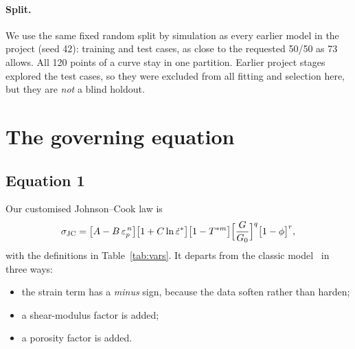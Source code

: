 \documentclass[11pt,a4paper]{article}
\newcommand{\sjc}{\sigma_{\mathrm{JC}}}
\begin{document}
\paragraph{Split.} We use the same fixed random split by simulation as every earlier model in the project (seed 42): \nTrainCases{} training and \nTestCasesSplit{} test cases, as close to the requested 50/50 as 73 allows. All 120 points of a curve stay in one partition. Earlier project stages explored the test cases, so they were excluded from all fitting and selection here, but they are \emph{not} a blind holdout.

\section{The governing equation}
\subsection{Equation 1}
Our customised Johnson--Cook law is
\begin{equation}
\sjc=\bigl[A-B\,\varepsilon_p^{\,n}\bigr]\bigl[1+C\ln\dot\varepsilon^*\bigr]\bigl[1-T^{*m}\bigr]\Bigl[\frac{G}{G_0}\Bigr]^{q}\bigl[1-\phi\bigr]^{r},
\label{eq:jc}
\end{equation}
with the definitions in Table~\ref{tab:vars}. It departs from the classic model~\cite{johnson1983} in three ways:
\begin{itemize}
\item the strain term has a \emph{minus} sign, because the data soften rather than harden;
\item a shear-modulus factor is added;
\item a porosity factor is added.
\end{itemize}
\end{document}
